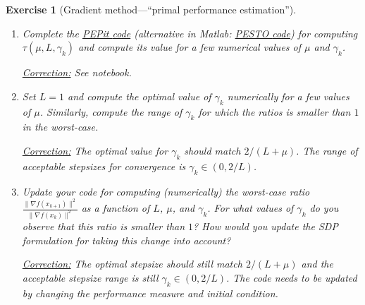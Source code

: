 \documentclass[11pt,a4paper]{article}
\newcommand{\pesto}{{PESTO }}
\newcommand{\pepit}{{PEPit }}
\newcommand{\correction}[1]{{{\color{blue}\underline{Correction:} #1}}}
\newcommand{\correction}[1]{}
\newtheorem{exercise}{Exercise}
\begin{document}
\begin{exercise}[Gradient method---``primal performance estimation'']
\begin{enumerate}
	\item Complete the \href{https://github.com/PerformanceEstimation/Learning-Performance-Estimation/tree/main/Codes/Exercise01.ipynb}{\pepit code} (alternative in Matlab: \href{https://github.com/PerformanceEstimation/Learning-Performance-Estimation/blob/main/Codes/Matlab/Exercise1.m}{\pesto code}) for computing $\tau(\mu,L,\gamma_k)$ and compute its value for a few numerical values of $\mu$ and $\gamma_k$.
	
	\correction{See notebook.}
	
	\item Set $L=1$ and compute the optimal value of $\gamma_k$ numerically for a few values of $\mu$. Similarly, compute the range of $\gamma_k$ for which the ratios is smaller than $1$ in the worst-case.
	
	\correction{The optimal value for $\gamma_k$ should match $2/(L+\mu)$. The range of acceptable stepsizes for convergence is $\gamma_k\in(0,2/L)$.}
	
	\item Update your code for computing (numerically) the worst-case ratio $\frac{\|\nabla f(x_{k+1})\|^2}{\|\nabla f(x_k)\|^2}$ as a function of $L$, $\mu$, and $\gamma_k$. For what values of $\gamma_k$ do you observe that this ratio is smaller than $1$?  How would you update the SDP formulation for taking this change into account?
	
	\correction{The optimal stepsize should still match $2/(L+\mu)$ and the acceptable stepsize range is still $\gamma_k\in(0,2/L)$. The code needs to be updated by changing the performance measure and initial condition.
	
}
\end{enumerate}
\end{exercise}
\end{document}
